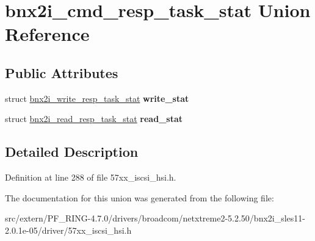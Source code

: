 \hypertarget{unionbnx2i__cmd__resp__task__stat}{
\section{bnx2i\_\-cmd\_\-resp\_\-task\_\-stat Union Reference}
\label{unionbnx2i__cmd__resp__task__stat}
}
\subsection*{Public Attributes}
\begin{DoxyCompactItemize}
\item 
\hypertarget{unionbnx2i__cmd__resp__task__stat_aeddf7038ea6c645999bbc6e864b59897}{
struct \hyperlink{structbnx2i__write__resp__task__stat}{bnx2i\_\-write\_\-resp\_\-task\_\-stat} {\bfseries write\_\-stat}}
\label{unionbnx2i__cmd__resp__task__stat_aeddf7038ea6c645999bbc6e864b59897}

\item 
\hypertarget{unionbnx2i__cmd__resp__task__stat_ae3c3f45a9cac890df88f8d941c6f4ec5}{
struct \hyperlink{structbnx2i__read__resp__task__stat}{bnx2i\_\-read\_\-resp\_\-task\_\-stat} {\bfseries read\_\-stat}}
\label{unionbnx2i__cmd__resp__task__stat_ae3c3f45a9cac890df88f8d941c6f4ec5}

\end{DoxyCompactItemize}


\subsection{Detailed Description}


Definition at line 288 of file 57xx\_\-iscsi\_\-hsi.h.



The documentation for this union was generated from the following file:\begin{DoxyCompactItemize}
\item 
src/extern/PF\_\-RING-\/4.7.0/drivers/broadcom/netxtreme2-\/5.2.50/bnx2i\_\-sles11-\/2.0.1e-\/05/driver/57xx\_\-iscsi\_\-hsi.h\end{DoxyCompactItemize}
